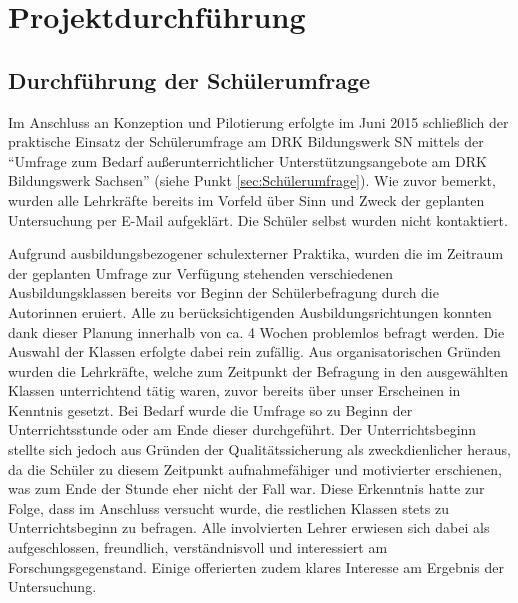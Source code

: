 \section{Projektdurchführung}
\label{sec:Projektdurchführung}

\subsection{Durchführung der Schülerumfrage}
\label{sec:DurchführungDerSchülerumfrage}

Im Anschluss an Konzeption und Pilotierung erfolgte im Juni 2015 schließlich der praktische Einsatz der Schülerumfrage am DRK Bildungswerk SN mittels der "`Umfrage zum Bedarf außerunterrichtlicher Unterstützungsangebote am DRK Bildungswerk Sachsen"' (siehe Punkt \ref{sec:Schülerumfrage}). Wie zuvor bemerkt, wurden alle Lehrkräfte bereits im Vorfeld über Sinn und Zweck der geplanten Untersuchung per E-Mail aufgeklärt. Die Schüler selbst wurden nicht kontaktiert. 

Aufgrund ausbildungsbezogener schulexterner Praktika, wurden die im Zeitraum der geplanten Umfrage zur Verfügung stehenden verschiedenen Ausbildungsklassen bereits vor Beginn der Schülerbefragung durch die Autorinnen eruiert. Alle zu berücksichtigenden Ausbildungsrichtungen konnten dank dieser Planung innerhalb von ca. 4 Wochen problemlos befragt werden. Die Auswahl der Klassen erfolgte dabei rein zufällig. Aus organisatorischen Gründen wurden die Lehrkräfte, welche zum Zeitpunkt der Befragung in den ausgewählten Klassen unterrichtend tätig waren, zuvor bereits über unser Erscheinen in Kenntnis gesetzt. Bei Bedarf wurde die Umfrage so zu Beginn der Unterrichtsstunde oder am Ende dieser durchgeführt. Der Unterrichtsbeginn stellte sich jedoch aus Gründen der Qualitätssicherung als zweckdienlicher heraus, da die Schüler zu diesem Zeitpunkt aufnahmefähiger und motivierter erschienen, was zum Ende der Stunde eher nicht der Fall war. Diese Erkenntnis hatte zur Folge, dass im Anschluss versucht wurde, die restlichen Klassen stets zu Unterrichtsbeginn zu befragen. Alle involvierten Lehrer erwiesen sich dabei als aufgeschlossen, freundlich, verständnisvoll und interessiert am Forschungsgegenstand.  Einige offerierten zudem klares Interesse am Ergebnis der Untersuchung. 

